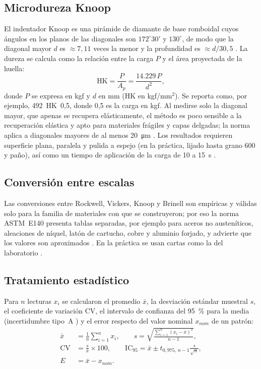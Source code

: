 \documentclass[journal,11pt]{IEEEtran}
\begin{document}
\subsection{Microdureza Knoop}
El indentador Knoop es una pirámide de diamante de base romboidal cuyos ángulos en los planos de las diagonales son $172^{\circ}30'$ y $130^{\circ}$, de modo que la diagonal mayor $d$ es $\approx7{,}11$ veces la menor y la profundidad es $\approx d/30{,}5$ \cite{knoop,astm384}. La dureza se calcula como la relación entre la carga $P$ y el área proyectada de la huella:
\begin{equation}
\mathrm{HK}=\frac{P}{A_p}=\frac{\num{14.229}\,P}{d^{2}},
\label{eq:knoop}
\end{equation}
donde $P$ se expresa en kgf y $d$ en mm (HK en kgf/mm$^2$). Se reporta como, por ejemplo, 492~HK~0,5, donde 0,5 es la carga en kgf. Al medirse solo la diagonal mayor, que apenas se recupera elásticamente, el método es poco sensible a la recuperación elástica y apto para materiales frágiles y capas delgadas; la norma aplica a diagonales mayores de al menos \SI{20}{\micro\metre} \cite{iso4545}. Los resultados requieren superficie plana, paralela y pulida a espejo (en la práctica, lijado hasta grano 600 y paño), así como un tiempo de aplicación de la carga de 10 a 15~s \cite{astm384}.

\subsection{Conversión entre escalas}
Las conversiones entre Rockwell, Vickers, Knoop y Brinell son empíricas y válidas solo para la familia de materiales con que se construyeron; por eso la norma ASTM~E140 presenta tablas separadas, por ejemplo para aceros no austeníticos, aleaciones de níquel, latón de cartucho, cobre y aluminio forjado, y advierte que los valores son aproximados \cite{astm140}. En la práctica se usan cartas como la del laboratorio \cite{leco}.

\subsection{Tratamiento estadístico}
Para $n$ lecturas $x_i$ se calcularon el promedio $\bar{x}$, la desviación estándar muestral $s$, el coeficiente de variación $\mathrm{CV}$, el intervalo de confianza del 95~\% para la media (incertidumbre tipo~A \cite{gum}) y el error respecto del valor nominal $x_{nom}$ de un patrón:
\begin{align}
\bar{x}&=\frac{1}{n}\sum_{i=1}^{n}x_i, \qquad
s=\sqrt{\frac{\sum_{i=1}^{n}(x_i-\bar{x})^2}{n-1}}, \label{eq:stat1}\\
\mathrm{CV}&=\frac{s}{\bar{x}}\times100, \qquad
\mathrm{IC}_{95}=\bar{x}\pm t_{0{,}975,\,n-1}\frac{s}{\sqrt{n}}, \label{eq:stat2}\\
E&=\bar{x}-x_{nom}. \label{eq:error}
\end{align}
\end{document}
